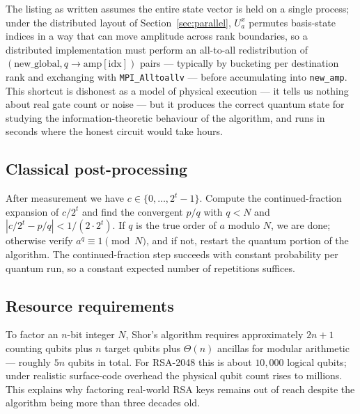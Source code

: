 The listing as written assumes the entire state vector is held on a single process; under the distributed layout of Section~\ref{sec:parallel}, $U_a^x$ permutes basis-state indices in a way that can move amplitude across rank boundaries, so a distributed implementation must perform an all-to-all redistribution of $(\text{new\_global}, q\!\to\!\text{amp}[\text{idx}])$ pairs --- typically by bucketing per destination rank and exchanging with \verb|MPI_Alltoallv| --- before accumulating into \verb|new_amp|. This shortcut is dishonest as a model of physical execution --- it tells us nothing about real gate count or noise --- but it produces the correct quantum state for studying the information-theoretic behaviour of the algorithm, and runs in seconds where the honest circuit would take hours.

\subsection{Classical post-processing}

After measurement we have $c \in \{0, \ldots, 2^t - 1\}$. Compute the continued-fraction expansion of $c/2^t$ and find the convergent $p/q$ with $q < N$ and $|c/2^t - p/q| < 1/(2 \cdot 2^t)$. If $q$ is the true order of $a$ modulo $N$, we are done; otherwise verify $a^q \equiv 1 \pmod{N}$, and if not, restart the quantum portion of the algorithm. The continued-fraction step succeeds with constant probability per quantum run, so a constant expected number of repetitions suffices.

\subsection{Resource requirements}

To factor an $n$-bit integer $N$, Shor's algorithm requires approximately $2n+1$ counting qubits plus $n$ target qubits plus $\Theta(n)$ ancillas for modular arithmetic --- roughly $5n$ qubits in total. For RSA-2048 this is about $10{,}000$ logical qubits; under realistic surface-code overhead the physical qubit count rises to millions. This explains why factoring real-world RSA keys remains out of reach despite the algorithm being more than three decades old.

